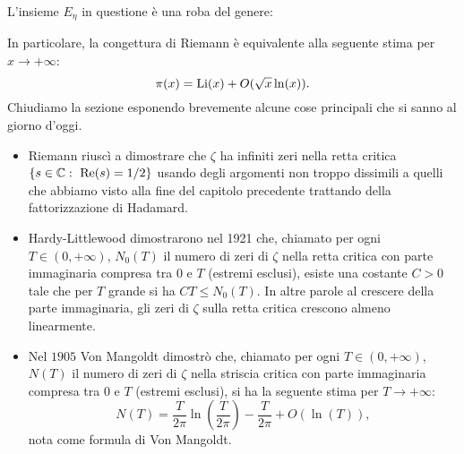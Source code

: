 \documentclass[11pt]{book}
\theoremstyle{Definizione}
\theoremstyle{TeoremaProposizioneLemmaCorollarioCongettura}
\theoremstyle{OsservazioneNotaEsempio}
\newcommand{\R}{\mathbb{R}}
\newcommand{\C}{\mathbb{C}}
\renewcommand{\Re}{\textup{Re}}
\renewcommand{\i}{\textup{i}}
\begin{document}
L'insieme $E_\eta$ in questione è una roba del genere:
\begin{center}
\end{center}
\indent
In particolare, la congettura di Riemann è equivalente alla seguente stima per $x \to +\infty$:
$$
\pi(x) = \textup{Li}(x) + O(\sqrt{x}\ln(x)).
$$
Chiudiamo la sezione esponendo brevemente alcune cose principali che si sanno al giorno d'oggi.
\begin{itemize}
\item Riemann riuscì a dimostrare che $\zeta$ ha infiniti zeri nella retta critica $\{s\in \C:\ \Re(s) = 1/2\}$ usando degli argomenti non troppo dissimili a quelli che abbiamo visto alla fine del capitolo precedente trattando della fattorizzazione di Hadamard.
\item Hardy-Littlewood dimostrarono nel 1921 che, chiamato per ogni $T\in (0,+\infty)$, $N_0(T)$ il numero di zeri di $\zeta$ nella retta critica con parte immaginaria compresa tra $0$ e $T$ (estremi esclusi), esiste una costante $C > 0$ tale che per $T$ grande si ha $CT \leq N_0(T)$. In altre parole al crescere della parte immaginaria, gli zeri di $\zeta$ sulla retta critica crescono almeno linearmente.
\item Nel $1905$ Von Mangoldt dimostrò che, chiamato per ogni $T\in (0,+\infty)$, $N(T)$ il numero di zeri di $\zeta$ nella striscia critica con parte immaginaria compresa tra $0$ e $T$ (estremi esclusi), si ha la seguente stima per $T \to +\infty$:
$$
N(T) = \frac{T}{2\pi} \ln\left(\frac{T}{2\pi}\right)-\frac{T}{2\pi} + O(\ln(T)),
$$
nota come formula di Von Mangoldt.
\end{itemize}
\end{document}

